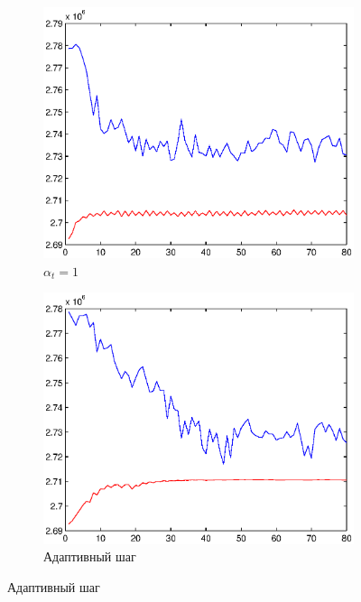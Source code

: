 \documentclass{article}
\begin{document}
\begin{figure}
    \begin{subfigure}[t]{0.7\textwidth}
            \centering
            \includegraphics[width=\textwidth]{constant_1_convergence.eps}
            \caption{$\alpha_t = 1$}
    \end{subfigure}
    \begin{subfigure}[t]{0.7\textwidth}
            \centering
            \includegraphics[width=\textwidth]{adaptive_convergence.eps}
            \caption{Адаптивный шаг}
    \end{subfigure}
\end{figure}
\end{document}
